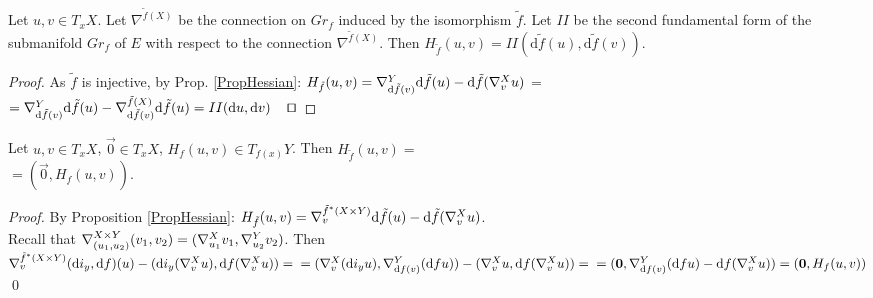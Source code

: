 \documentclass{llncs}
\newcommand{\CovariantDiffManif}[1]{\nabla^{#1}}
\newcommand{\CovariantDerivManif}[2]{\tensor*{\nabla}{^{#1}_{#2}}}
\newcommand{\Diff}{\mathrm{d}}
\newcommand {\Preimage}[2]{{#2}^*{#1}}
\begin{document}
\begin{lemma}  \label{LemSecondFormHessian}
Let $u, v \in T_xX$. Let $\CovariantDiffManif{\tilde{f}(X)}$ be the connection on $Gr_f$ induced by the isomorphism $\tilde{f}$. Let $II$ be the second fundamental form of the submanifold $Gr_f$ of $E$ with respect to the connection $\CovariantDiffManif{\tilde{f}(X)}$. Then 
$H_{\tilde{f}}(u, v) = II(\Diff \tilde{f}(u), \Diff \tilde{f}(v))$.
\end{lemma}
\begin{proof}
As $\tilde{f}$ is injective, by Prop. \ref{PropHessian}:
$H_{\tilde{f}}(u, v) = 
						\CovariantDerivManif{Y} {\Diff \tilde{f}(v)} \Diff \tilde{f}(u) - 
							\Diff \tilde{f}(\CovariantDerivManif{X}{v}u )$ = 
							\\
							$=\CovariantDerivManif{Y} {\Diff \tilde{f}(v)} \Diff \tilde{f}(u) - 
							\CovariantDerivManif{\tilde{f}(X)}{\Diff \tilde{f}(v)}\Diff \tilde{f}(u) = II(\Diff u, \Diff v)\,\textrm{\qed}$
\end{proof}

\begin{proposition} \label{PropBigSmallHess}
Let $u, v \in T_xX$, $\vec{0} \in T_xX$, $H_f(u, v) \in T_{f(x)}Y$.
Then $H_{\tilde{f}}(u, v) =$
\\
$= (\vec{0}, H_f(u, v))$.
\end{proposition}

\begin{proof}
By Proposition \ref{PropHessian}: 
$H_{\tilde{f}}(u, v)=\CovariantDerivManif{\Preimage{(X \times Y)}{\tilde{f}}} {v} \Diff \tilde{f}(u) - 
							\Diff \tilde{f}( 
							\CovariantDerivManif{X}{v}u
							)$.
\\
Recall that $\CovariantDerivManif{X\times Y}{(u_1, u_2)}{(v_1, v_2)} = (\CovariantDerivManif{X}{u_1}{v_1}, \CovariantDerivManif{Y}{u_2}{v_2})$. Then
							\\
							$\CovariantDerivManif{\Preimage{(X \times Y)}{\tilde{f}}}{v} (\Diff i_y, \Diff f)(u) 							
							 - (\Diff i_y( 
							\CovariantDerivManif{X}{v}u
							), \Diff f( 
							\CovariantDerivManif{X}{v}u
							)) = 
							\\
							=(\CovariantDerivManif{X}{v} (\Diff i_y u), \CovariantDerivManif{Y}{\Diff f(v)} (\Diff f u)) - 
							(\CovariantDerivManif{X}{v}u, \Diff f( 
							\CovariantDerivManif{X}{v}u)
							) =
							\\
							=(\vec{0}, \CovariantDerivManif{Y}{\Diff f(v)} (\Diff f u) - \Diff f( 
							\CovariantDerivManif{X}{v}u)) =
							(\vec{0}, H_f(u, v))$ \textrm{\qed }

\end{proof}
\end{document}
